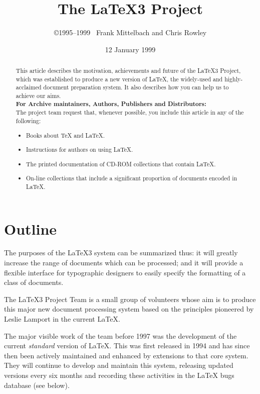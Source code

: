 \documentclass[a4paper]{article}
\title{\Large The \LaTeX3 Project}
\author{\copyright 1995--1999 \ 
Frank Mittelbach and
Chris Rowley}
\date{12 January 1999}
\begin{document}
\thispagestyle{empty}

\maketitle

\begin{abstract}
  This article describes the motivation, achievements and future of
  the \LaTeX3 Project, which was established to produce a new version
  of \LaTeX{}, the widely-used and highly-acclaimed document
  preparation system.  It also describes how you can help us to
  achieve our aims.\\[2pt]
  \textbf{For Archive maintainers, Authors, Publishers and
          Distributors:}\\
  The project team request that, whenever possible, you include this
  article in any of the following:
  \begin{itemize}
  \item Books about \TeX{} and \LaTeX{}.
  \item Instructions for authors on using \LaTeX{}.
  \item The printed documentation of CD-ROM collections that contain
    \LaTeX.
  \item On-line collections that include a significant proportion of
    documents encoded in \LaTeX. 
\end{itemize}
\end{abstract}

\section{Outline}

The purposes of the \LaTeX3 system can be summarized thus: it will
greatly increase the range of documents which can be processed; and it
will provide a flexible interface for typographic designers to easily
specify the formatting of a class of documents.
 
The \LaTeX3 Project Team is a small group of volunteers whose aim is
to produce this major new document processing system based on the
principles pioneered by Leslie Lamport in the current \LaTeX.

The major visible work of the team before 1997 was the development of
the current \emph{standard} version of \LaTeX{}.  This was first
released in 1994 and has since then been actively maintained and
enhanced by extensions to that core system.  They will continue to
develop and maintain this system, releasing updated versions every six
months and recording these activities in the \LaTeX{} bugs database
(see below).
  
\end{document}
